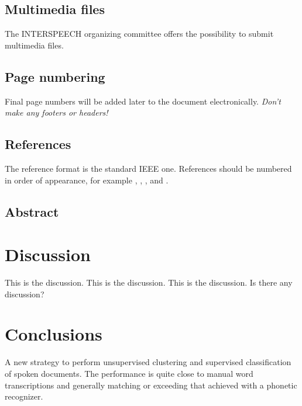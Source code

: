 \documentclass[a4paper]{article}
\begin{document}
\subsection{Multimedia files}

The INTERSPEECH organizing committee offers the possibility to submit multimedia files.

\subsection{Page numbering}

Final page numbers will be added later to the document electronically. \emph{Don't make any footers or headers!}


\subsection{References}

The reference format is the standard IEEE one. References should be numbered in order of appearance, for example \cite{Davis80-COP}, \cite{Rabiner89-ATO}, \cite[pp.\ 417--422]{Hastie09-TEO}, and \cite{YourName17-XXX}.

\subsection{Abstract}

\section{Discussion}

This is the discussion. This is the discussion. This is the discussion. Is there any discussion?

\section{Conclusions}
A new strategy to perform unsupervised clustering and supervised classification of spoken documents. The performance is quite close to manual word transcriptions and generally matching or exceeding that achieved with a phonetic recognizer.





\end{document}
